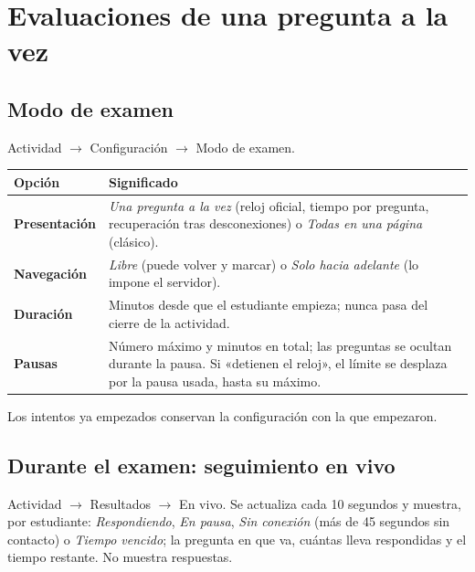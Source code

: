 \documentclass[11pt,a4paper,oneside]{book}
\newcommand{\ruta}[1]{\textsf{#1}}
\begin{document}
\chapter{Evaluaciones de una pregunta a la vez}

\section{Modo de examen}
\ruta{Actividad $\rightarrow$ Configuración $\rightarrow$ Modo de examen}.

\begin{center}
\begin{tabularx}{\linewidth}{>{\bfseries}l X}
\toprule
Opción & Significado \\
\midrule
Presentación & \emph{Una pregunta a la vez} (reloj oficial, tiempo por pregunta, recuperación tras desconexiones) o
               \emph{Todas en una página} (clásico). \\
Navegación & \emph{Libre} (puede volver y marcar) o \emph{Solo hacia adelante} (lo impone el servidor). \\
Duración & Minutos desde que el estudiante empieza; nunca pasa del cierre de la actividad. \\
Pausas & Número máximo y minutos en total; las preguntas se ocultan durante la pausa. Si «detienen el reloj», el
         límite se desplaza por la pausa usada, hasta su máximo. \\
\bottomrule
\end{tabularx}
\end{center}

Los intentos ya empezados conservan la configuración con la que empezaron.

\section{Durante el examen: seguimiento en vivo}
\ruta{Actividad $\rightarrow$ Resultados $\rightarrow$ En vivo}. Se actualiza cada 10 segundos y muestra, por
estudiante: \emph{Respondiendo}, \emph{En pausa}, \emph{Sin conexión} (más de 45 segundos sin contacto) o
\emph{Tiempo vencido}; la pregunta en que va, cuántas lleva respondidas y el tiempo restante. No muestra respuestas.
\end{document}
